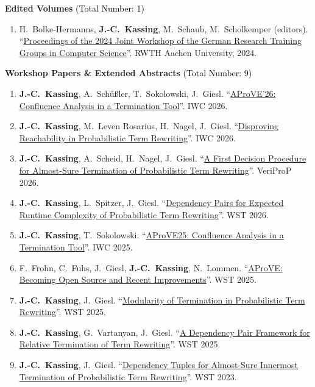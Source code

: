 \documentclass[letterpaper,11pt]{article}
\newcommand{\sectioncount}[1]{{\normalfont\normalsize\textcolor{black}{(Total Number: #1)}}}
\begin{document}
    \item \textbf{Edited Volumes} \sectioncount{1}
    \begin{enumerate}
      \item H.\ Bolke-Hermanns, \textbf{J.-C.\ Kassing}, M.\ Schaub, M.\ Scholkemper (editors). ``\href{https://www.dagstuhl.de/storage/media/0006/6020/2024_Dagstuhl-Proceedings.pdf}{Proceedings of the 2024 Joint Workshop of the German Research Training Groups in Computer Science}''. RWTH Aachen University, 2024.
    \end{enumerate}
    \item \textbf{Workshop Papers \& Extended Abstracts} \sectioncount{9}
    \begin{enumerate}
      \item \textbf{J.-C.\ Kassing}, A.\ Schüßler, T.\ Sokolowski, J.\ Giesl. ``\href{https://jckassing.com/files/paper/AProVE_CoCo26.pdf}{AProVE'26: Confluence Analysis in a Termination Tool}''. IWC 2026.
      \item \textbf{J.-C.\ Kassing}, M.\ Leven Rosarius, H.\ Nagel, J.\ Giesl. ``\href{https://jckassing.com/files/paper/preach_IWC26.pdf}{Disproving Reachability in Probabilistic Term Rewriting}''. IWC 2026.
      \item \textbf{J.-C.\ Kassing}, A.\ Scheid, H.\ Nagel, J.\ Giesl. ``\href{https://jckassing.com/files/paper/GroundDec_VeriProP26.pdf}{A First Decision Procedure for Almost-Sure Termination of Probabilistic Term Rewriting}''. VeriProP 2026.
      \item \textbf{J.-C.\ Kassing}, L.\ Spitzer, J.\ Giesl. ``\href{https://jckassing.com/files/paper/ShortPPDP_WST26.pdf}{Dependency Pairs for Expected Runtime Complexity of Probabilistic Term Rewriting}''. WST 2026.
      \item \textbf{J.-C.\ Kassing}, T.\ Sokolowski. ``\href{https://jckassing.com/files/paper/AProVE_CoCo25.pdf}{AProVE25: Confluence Analysis in a Termination Tool}''. IWC 2025.
      \item F.\ Frohn, C.\ Fuhs, J.\ Giesl, \textbf{J.-C.\ Kassing}, N.\ Lommen. ``\href{https://jckassing.com/files/paper/AProVE_WST25.pdf}{AProVE: Becoming Open Source and Recent Improvements}''. WST 2025.
      \item \textbf{J.-C.\ Kassing}, J.\ Giesl. ``\href{https://jckassing.com/files/paper/ProbModularity_WST25.pdf}{Modularity of Termination in Probabilistic Term Rewriting}''. WST 2025.
      \item \textbf{J.-C.\ Kassing}, G.\ Vartanyan, J.\ Giesl. ``\href{https://jckassing.com/files/paper/RelativeADP_WST25.pdf}{A Dependency Pair Framework for Relative Termination of Term Rewriting}''. WST 2025.
      \item \textbf{J.-C.\ Kassing}, J.\ Giesl. ``\href{https://arxiv.org/abs/2307.10002}{Dependency Tuples for Almost-Sure Innermost Termination of Probabilistic Term Rewriting}''. WST 2023.
    \end{enumerate}
\end{document}

